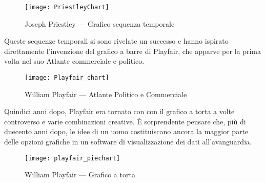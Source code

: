 \begin{figure}[htp]
    \centering
    \texttt{[image: PriestleyChart]}
    \caption{Joseph Priestley — Grafico sequenza temporale}
    \label{fig:PriestleyChart}
\end{figure}

\noindent Queste sequenze temporali si sono rivelate un successo e hanno ispirato direttamente l'invenzione del grafico a barre di Playfair, che apparve per la prima volta nel suo Atlante commerciale e politico.

\begin{figure}[htp]
    \centering
    \texttt{[image: Playfair\_chart]}
    \caption{William Playfair — Atlante Politico e Commerciale}
    \label{fig:playfair_chart}
\end{figure}

\noindent Quindici anni dopo, Playfair era tornato con con il grafico a torta a volte controverso e varie combinazioni creative. È sorprendente pensare che, più di duecento anni dopo, le idee di un uomo costituiscano ancora la maggior parte delle opzioni grafiche in un software di visualizzazione dei dati all'avanguardia.

\begin{figure}[htp]
    \centering
    \texttt{[image: playfair\_piechart]}
    \caption{William Playfair — Grafico a torta}
    \label{fig:playfair_piechart}
\end{figure}




